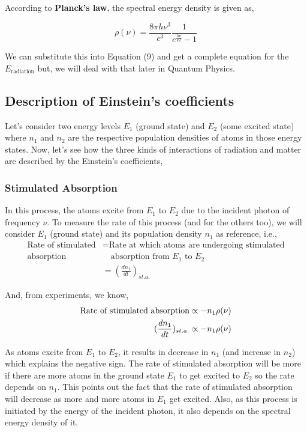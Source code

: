 \documentclass[12pt]{article}
\begin{document}
According to \textbf{Planck's law}, the spectral energy density is given as,

\begin{equation}
    \rho(\nu) = \frac{8\pi h\nu^3}{c^3} \frac{1}{e^\frac{h\nu}{kT} - 1}
\end{equation}

We can substitute this into Equation (9) and get a complete equation for the $E_{\text{radiation}}$ but, we will deal with that later in Quantum Physics.

\subsection{Description of Einstein's coefficients}

Let's consider two energy levels $E_{1}$ (ground state) and $E_{2}$ (some excited state) where $n_{1}$ and $n_{2}$ are the respective population densities of atoms in those energy states. Now, let's see how the three kinds of interactions of radiation and matter are described by the Einstein's coefficients,

\subsubsection{Stimulated Absorption}

In this process, the atoms excite from $E_{1}$ to $E_{2}$ due to the incident photon of frequency $\nu$. To measure the rate of this process (and for the others too), we will consider $E_{1}$ (ground state) and its population density $n_{1}$ as reference, i.e.,
\begin{align*}
    \text{Rate of stimulated} & = \text{Rate at which atoms are undergoing stimulated} \\
    \text{absorption} & \quad \text{absorption from } E_{1} \text{ to } E_{2} \\ 
    & = (\frac{dn_{1}}{dt})_{st.a.}
\end{align*}

And, from experiments, we know, 
\begin{align*}
    \textnormal{Rate of stimulated absorption} \propto -n_{1}\rho(\nu) \\ 
    (\frac{dn_{1}}{dt})_{st.a.} \propto -n_{1}\rho(\nu)
\end{align*}

As atoms excite from $E_{1}$ to $E_{2}$, it results in decrease in $n_{1}$ (and increase in $n_{2}$) which explains the negative sign. The rate of stimulated absorption will be more if there are more atoms in the ground state $E_{1}$ to get excited to $E_{2}$ so the rate depends on $n_{1}$. This points out the fact that the rate of stimulated absorption will decrease as more and more atoms in $E_{1}$ get excited. Also, as this process is initiated by the energy of the incident photon, it also depends on the spectral energy density of it. \vspace{.2cm}
\end{document}
